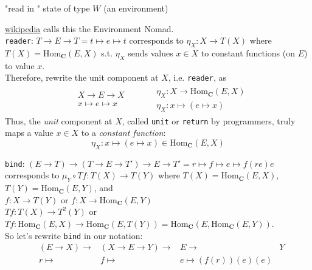 "read in " state of type $W$ (an environment)

\href{https://en.wikipedia.org/wiki/Monad_(functional_programming)#State_monads}{wikipedia} calls this the Environment Nomad. \\

\texttt{reader}: $T \to E \to T = t\mapsto e \mapsto t$ corresponds to $\eta_X : X \to T(X)$ where $T(X) = \text{Hom}_{\mathbf{C}}(E,X)$ s.t. $\eta_X$ sends values $x\in X $ to constant functions (on $E$) to value $x$. \\

Therefore, rewrite the unit component at $X$, i.e. \texttt{reader}, as \\
\begin{equation}
\begin{gathered}
\begin{aligned}
& X \to E \to X \\
& x \mapsto e \mapsto x
\end{aligned} \qquad \, 
\begin{aligned}
	& \eta_X : X \to \text{Hom}_{\mathbf{C}}(E,X) \\ 
	& \eta_X : x \mapsto (e\mapsto x)
\end{aligned}
\end{gathered}
\end{equation}
Thus, the \emph{unit} component at $X$, called \texttt{unit} or \texttt{return} by programmers, truly maps a value $x \in X$ to a \emph{constant function}:
\begin{equation}
\eta_X : x \mapsto (e \mapsto x) \in \text{Hom}_{\mathbf{C}}(E, X)
\end{equation}


\texttt{bind}: $(E\to T) \to (T\to E \to T') \to E \to T' = r\mapsto f \mapsto e \mapsto f(re)e$ corresponds to $\mu_Y \circ Tf:T(X) \to T(Y)$ where $T(X) = \text{Hom}_{\mathbf{C}}(E,X)$, $T(Y) = \text{Hom}_{\mathbf{C}}(E,Y)$, and \\
$f:X\to T(Y)$ or $f:X\to \text{Hom}_{\mathbf{C}}(E,Y)$ \\
$Tf : T(X) \to T^2(Y)$ or $Tf : \text{Hom}_{\mathbf{C}}(E,X) \to \text{Hom}_{\mathbf{C}}(E,T(Y)) = \text{Hom}_{\mathbf{C}}(E, \text{Hom}_{\mathbf{C}}(E,Y))$. \\

So let's rewrite \texttt{bind} in our notation:
\[
\begin{aligned}
	& (E\to X) \to & (X \to E \to Y) \to & E \to & Y \\
	& r \mapsto & f \mapsto & e \mapsto (f(r))(e)(e)
\end{aligned}
\]

